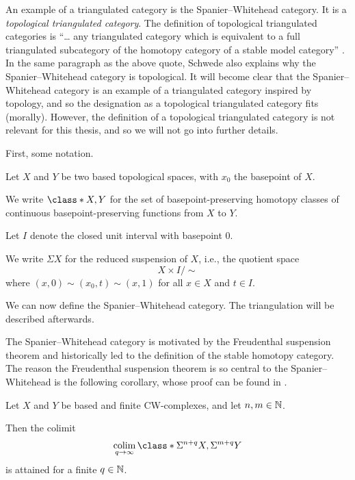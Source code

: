 An example of a triangulated category is the Spanier--Whitehead category. It is a \emph{topological triangulated category}. The definition of topological triangulated categories is ``… any triangulated category which is equivalent to a full triangulated subcategory of the homotopy category of a stable model category'' \cite[p.\ 6]{Schwede_2010}. In the same paragraph as the above quote, Schwede also explains why the Spanier--Whitehead category is topological. It will become clear that the Spanier--Whitehead category is an example of a triangulated category inspired by topology, and so the designation as a topological triangulated category fits (morally). However, the definition of a topological triangulated category is not relevant for this thesis, and so we will not go into further details. 

First, some notation.
\begin{notation}
    Let \( X \) and \( Y \) be two based topological spaces, with \( x_0 \) the basepoint of \( X \).

    We write \( \class*{ X, Y } \) for the set of basepoint-preserving homotopy classes of continuous basepoint-preserving functions from \( X \) to \( Y \).

    Let \( I \) denote the closed unit interval with basepoint \( 0 \).

    We write \( \Sigma X \) for the reduced suspension of \( X \), i.e., the quotient space
    \[
        X \times I / \sim
    \]
    where \( (x, 0) \sim (x_0, t) \sim (x, 1) \) for all \( x \in X \)  and \( t \in I \).
\end{notation}

We can now define the Spanier--Whitehead category. The triangulation will be described afterwards.

The Spanier--Whitehead category is motivated by the Freudenthal suspension theorem and historically led to the definition of the stable homotopy category. The reason the Freudenthal suspension theorem is so central to the Spanier--Whitehead is the following corollary, whose proof can be found in \cite[Remark 5.2]{Daria_Bachelor}.

\begin{corollary}
    \label{cor:sw_freudenthal_suspension}
    Let \( X \) and \( Y \) be based and finite CW-complexes, and let \( n, m \in {\mathbb{N}} \).
    
    Then the colimit
    \[
        \colim_{q \to \infty} \class*{ \Sigma^{n + q} X, \Sigma^{m + q} Y }
    \]
    is attained for a finite \( q \in {\mathbb{N}} \).
\end{corollary}

